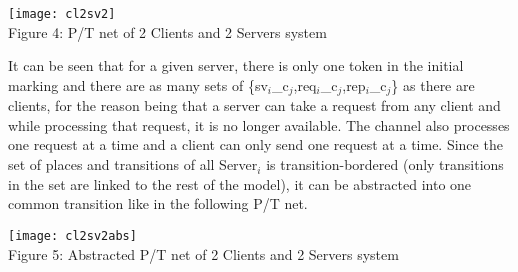 \documentclass{article}
\begin{document}
	\begin{center}
		\texttt{[image: cl2sv2]}
		\\Figure 4: P/T net of 2 Clients and 2 Servers system
	\end{center}
	It can be seen that for a given server, there is only one token in the initial marking and there are as many sets of \{sv$_i$\_c$_j$,req$_i$\_c$_j$,rep$_i$\_c$_j$\} as there are clients, for the reason being that a server can take a request from any client and while processing that request, it is no longer available. The channel also processes one request at a time and a client can only send one request at a time. Since the set of places and transitions of all Server$_i$ is transition-bordered (only transitions in the set are linked to the rest of the model), it can be abstracted into one common transition like in the following P/T net.
	\begin{center}
		\texttt{[image: cl2sv2abs]}
		\\Figure 5: Abstracted P/T net of 2 Clients and 2 Servers system
	\end{center}
\end{document}
